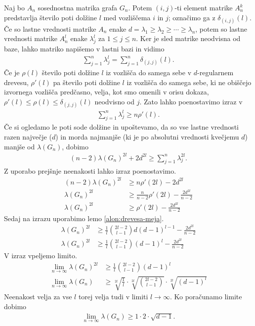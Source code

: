 \begin{dokaz}
    Naj bo \(A_n\) sosednostna matrika grafa \(G_n\). Potem \((i,j)\)-ti element matrike \(A_n^k\) predstavlja število poti dolžine \(l\) med vozliščema \(i\) in \(j\); označimo ga z \(\delta_{(i,j)}(l)\). Če so lastne vrednosti matrike \(A_n\) enake \(d=\lambda_1\geq \lambda_2 \geq \cdots \geq \lambda_n\), potem so lastne vrednosti matrike \(A_n^l\) enake \(\lambda_j^l\) za \(1\leq j \leq n\). Ker je sled matrike neodvisna od baze, lahko  matriko napišemo v lastni bazi in vidimo
    \begin{align*}
        \sum_{j=1}^n \lambda_j^l = \sum_{j=1}^n \delta_{(j, j)}(l).
    \end{align*}
    Če je \(\rho(l)\) število poti dolžine \(l\) iz vozlišča do samega sebe v \(d\)-regularnem drevesu, \(\rho'(l)\) pa število poti dolžine \(l\) iz vozlišča do samega sebe, ki ne obiščejo izvornega vozlišča predčasno, velja, kot smo omenili v orisu dokaza, \(\rho'(l) \leq \rho(l)\leq \delta_{(j,j)}(l)\) neodvisno od \(j\). Zato lahko poenostavimo izraz v
    \begin{align*}
        \sum_{j=1}^n \lambda_j^l \geq n \rho'(l).
    \end{align*}
    Če si ogledamo le poti sode dolžine in upoštevamo, da so vse lastne vrednosti razen največje (\(d\)) in morda najmanjše (ki je po absolutni vrednosti kvečjemu \(d\)) manjše od \(\lambda(G_n)\), dobimo
    \begin{align*}
        (n-2)\lambda(G_n)^{2l} + 2d^{2l} \geq \sum_{j=1}^n \lambda_j^{2l}.
    \end{align*}
    Z uporabo prejšnje neenakosti lahko izraz poenostavimo.
    \begin{align*}
        (n-2)\lambda(G_n)^{2l} &\geq n\rho'(2l) - 2d^{2l}\\
        \lambda(G_n)^{2l} &\geq \frac{n}{n-2}\rho'(2l) - \frac{2d^{2l}}{n-2}\\
        \lambda(G_n)^{2l} &\geq \rho'(2l) - \frac{2d^{2l}}{n-2}
    \end{align*}
    Sedaj na izrazu uporabimo lemo \ref{alon:drevesa-meja}.
    \begin{align*}
        \lambda(G_n)^{2l} &\geq \frac{1}{l}\binom{2l-2}{l-1}d(d-1)^{l-1} - \frac{2d^{2l}}{n-2} \\
        \lambda(G_n)^{2l} &\geq \frac{1}{l}\binom{2l-2}{l-1}(d-1)^{l} - \frac{2d^{2l}}{n-2}
    \end{align*}
    V izraz vpeljemo limito.
    \begin{align*}
        \lim_{n\to\infty} \lambda(G_n)^{2l} &\geq \frac{1}{l}\binom{2l-2}{l-1}(d-1)^{l}\\
        \lim_{n\to\infty} \lambda(G_n) &\geq \sqrt[2l]{\frac{1}{l}}\cdot \sqrt[2l]{\binom{2l-2}{l-1}}\cdot \sqrt[2l]{(d-1)^{l}}
    \end{align*}
    Neenakost velja za vse \(l\) torej velja tudi v limiti \(l\to\infty\). Ko poračunamo limite \cite{polatajko} dobimo
    \begin{align*}
        \lim_{n\to\infty} \lambda(G_n) \geq 1 \cdot 2 \cdot \sqrt{d-1}.
    \end{align*}
\end{dokaz}
